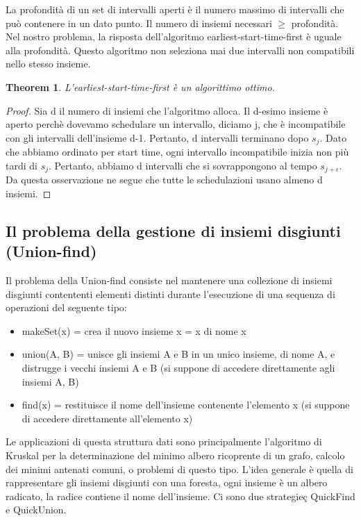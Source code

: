 \documentclass{article}
\newtheorem{theorem}{Theorem}[subsection]
\begin{document}
La profondità di un set di intervalli aperti è il numero massimo di intervalli che può contenere in un dato punto. Il numero di insiemi necessari $\geq$ profondità. Nel nostro problema, la risposta dell'algoritmo earliest-start-time-first è uguale alla profondità. Questo algoritmo non seleziona mai due intervalli non compatibili nello stesso insieme.
\begin{theorem}
    L'earliest-start-time-first è un algorittimo ottimo.
\end{theorem}
\begin{proof}
    Sia d il numero di insiemi che l'algoritmo alloca. Il d-esimo insieme è aperto perchè dovevamo schedulare un intervallo, diciamo j, che è incompatibile con gli intervalli dell'insieme d-1. Pertanto, d intervalli terminano dopo $s_j$. Dato che abbiamo ordinato per start time, ogni intervallo incompatibile inizia non più tardi di $s_j$. Pertanto, abbiamo d intervalli che si sovrappongono al tempo $s_{j+\epsilon}$. Da questa osservazione ne segue che tutte le schedulazioni usano almeno d insiemi.
\end{proof}
\newpage
\subsection{Il problema della gestione di insiemi disgiunti (Union-find)}
Il problema della Union-find consiste nel mantenere una collezione di insiemi disgiunti contententi elementi distinti durante l'esecuzione di una sequenza di operazioni del seguente tipo:
\begin{itemize}
    \item makeSet(x) = crea il nuovo insieme x = {x} di nome x
    \item union(A, B) = unisce gli insiemi A e B in un unico insieme, di nome A, e distrugge i vecchi insiemi A e B (si suppone di accedere direttamente agli insiemi A, B)
    \item find(x) = restituisce il nome dell'insieme contenente l'elemento x (si suppone di accedere direttamente all'elemento x)
\end{itemize}
Le applicazioni di questa struttura dati sono principalmente l'algoritmo di Kruskal per la determinazione del minimo albero ricoprente di un grafo, calcolo dei minimi antenati comuni, o problemi di questo tipo.
L'idea generale è quella di rappresentare gli insiemi disgiunti con una foresta, ogni insieme è un albero radicato, la radice contiene il nome dell'insieme. Ci sono due strategieç QuickFind e QuickUnion.
\end{document}
